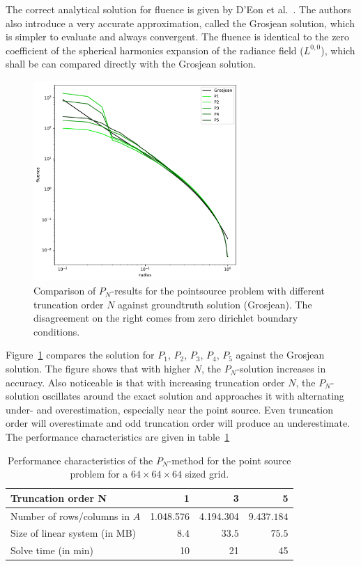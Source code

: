 The correct analytical solution for fluence is given by D'Eon et al.~\cite{dEon11}. The authors also introduce a very accurate approximation, called the Grosjean solution, which is simpler to evaluate and always convergent. The fluence is identical to the zero coefficient of the spherical harmonics expansion of the radiance field ($L^{0,0}$), which shall be can compared directly with the Grosjean solution.
\begin{figure}[h]
\centering
\includegraphics[width=0.7\textwidth]{04_pn_method/results/pointsource_pn.pdf}
\caption{Comparison of $P_N$-results for the pointsource problem with different truncation order $N$ against groundtruth solution (Grosjean). The disagreement on the right comes from zero dirichlet boundary conditions.}
\label{fig:pn_results_pointsource_1}
\end{figure}
Figure~\ref{fig:pn_results_pointsource_1} compares the solution for $P_1$, $P_2$, $P_3$, $P_4$, $P_5$ against the Grosjean solution. The figure shows that with higher $N$, the $P_N$-solution increases in accuracy. Also noticeable is that with increasing truncation order $N$, the $P_N$-solution oscillates around the exact solution and approaches it with alternating under- and overestimation, especially near the point source. Even truncation order will overestimate and odd truncation order will produce an underestimate. The performance characteristics are given in table~\ref{tab:results_pointsource}

\begin{table}[!h]
	\centering
	\caption{Performance characteristics of the $P_N$-method for the point source problem for a $64\times64\times64$ sized grid.}
	\label{tab:results_pointsource}
	\begin{tabular}{l r r r}
    \hline
	Truncation order \textbf{N}
    & 1 & 3 & 5
    \\
    \hline
    Number of rows/columns in $A$
    & 1.048.576 & 4.194.304 & $9.437.184$
    \\
    Size of linear system (in MB)
    & $8.4$ & $33.5$ & $75.5$
    \\
    Solve time (in min)
    & 10 & 21 & 45
	\end{tabular}
\end{table}

